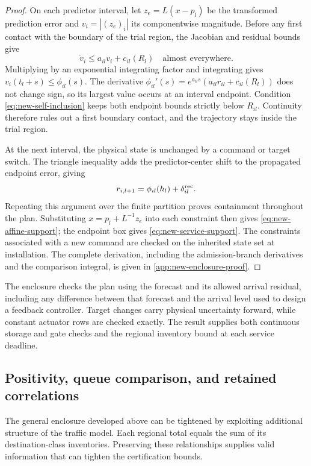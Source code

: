 \documentclass[preprint,12pt]{elsarticle}
\newcommand{\appref}[1]{\ref{#1}}
\begin{document}
\begin{proof}
On each predictor interval, let $z_e=L(x-p_l)$ be the transformed
prediction error and $v_i=|(z_e)_i|$ its componentwise magnitude.
Before any first contact with the
boundary of the trial region, the Jacobian and residual bounds give
\[
 \dot v_i\le a_{il}v_i+c_{il}(R_l)
 \quad\text{almost everywhere}.
\]
Multiplying by an exponential integrating factor and integrating gives
$v_i(t_l+s)\le\phi_{il}(s)$. The derivative
$\phi_{il}'(s)=e^{a_{il}s}(a_{il}r_{il}+c_{il}(R_l))$ does not change sign,
so its largest value occurs at an interval endpoint.
Condition \eqref{eq:new-self-inclusion} keeps both endpoint bounds
strictly below $R_{il}$. Continuity therefore rules out a first boundary
contact, and the trajectory stays inside the trial region.

At the next interval, the physical state is unchanged by a command or
target switch. The triangle inequality adds the predictor-center shift
to the propagated endpoint error, giving
\[
 r_{i,l+1}=\phi_{il}(h_l)+\delta^{\rm rec}_{il}.
\]
Repeating this argument over the finite partition proves containment
throughout the plan. Substituting $x=p_l+L^{-1}z_e$ into each constraint
then gives \eqref{eq:new-affine-support}; the endpoint box gives
\eqref{eq:new-service-support}. The constraints associated with a new
command are checked on the inherited state set at installation.
The complete derivation, including the admission-branch derivatives and
the comparison integral, is given in \appref{app:new-enclosure-proof}.
\end{proof}

The enclosure checks the plan using the forecast and its allowed arrival
residual, including any difference between that forecast and the arrival
level used to design a feedback controller. Target changes carry physical
uncertainty forward, while constant actuator rows are checked exactly. The
result supplies both continuous storage and gate checks and the regional
inventory bound at each service deadline.

\subsection{Positivity, queue comparison, and retained correlations}
\label{sec:structure-certificate}

The general enclosure developed above can be tightened by exploiting additional
structure of the traffic model. Each regional total equals the sum of its
destination-class inventories. Preserving these relationships supplies valid
information that can tighten the certification bounds.
\end{document}
